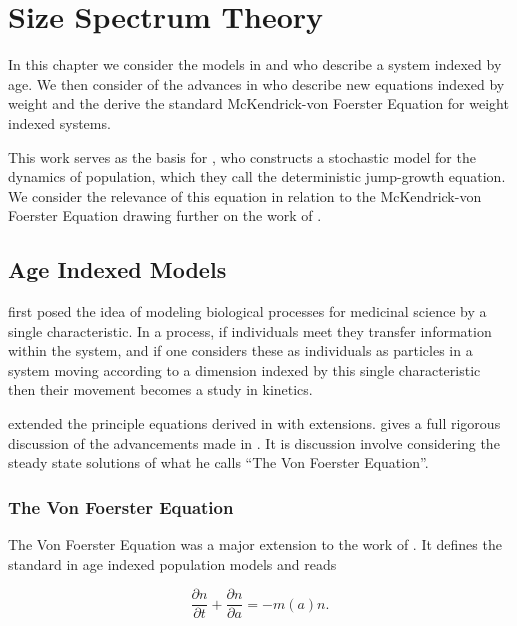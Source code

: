 \documentclass[../main]{subfiles}
\begin{document}
  \chapter{Size Spectrum Theory}\label{chapter:sizetheory}

  In this chapter we consider the models in \cite{mckendrick1926} and \cite{foerster1959} who describe a system indexed by age. We then consider of the advances in \cite{silvert1978} who describe new equations indexed by weight and the derive the standard McKendrick-von Foerster Equation for weight indexed systems.

  This work serves as the basis for \cite{datta2010}, who constructs a stochastic model for the dynamics of population, which they call the deterministic jump-growth equation. We consider the relevance of this equation in relation to the McKendrick-von Foerster Equation drawing further on the work of \cite{datta2010}.

  \section{Age Indexed Models}
  \cite{mckendrick1926} first posed the idea of modeling biological processes for medicinal science by a single characteristic. In a process, if individuals meet they transfer information within the system, and if one considers these as individuals as particles in a system moving according to a dimension indexed by this single characteristic then their movement becomes a study in kinetics.

  \cite{foerster1959} extended the principle equations derived in \cite{mckendrick1926} with extensions. \cite{trucco1965} gives a full rigorous discussion of the advancements made in \cite{foerster1959}. It is discussion involve considering the steady state solutions of what he calls ``The Von Foerster Equation''.

  \subsection{The Von Foerster Equation}

  The Von Foerster Equation was a major extension to the work of \cite{mckendrick1926}. It defines the standard in age indexed population models and reads

  \begin{equation}\label{theory:eq:vf}
    \frac{\partial n}{\partial t} + \frac{\partial n}{\partial a} = - m(a)n.
  \end{equation}
\end{document}
